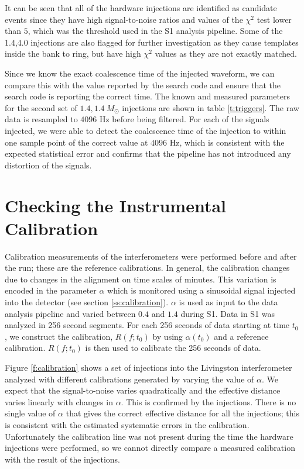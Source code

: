 It can be seen that all of the hardware injections are identified as candidate
events since they have high signal-to-noise ratios and values of the $\chi^2$
test lower than $5$, which was the threshold used in the S1 analysis
pipeline\cite{LIGOS1iul}. Some of the 1.4,4.0 injections are also flagged
for further investigation as they cause templates inside the bank to ring, but
have high $\chi^2$ values as they are not exactly matched.

Since we know the exact coalescence time of the injected waveform, we can
compare this with the value reported by the search code and ensure that the
search code is reporting the correct time.  The known and measured parameters
for the second set of $1.4,1.4\ M_\odot$ injections are shown in table
\ref{t:triggers}. The raw data is resampled to $4096$ Hz before being
filtered. For each of the signals injected, we were able to detect the
coalescence time of the injection to within one sample point of the correct
value at $4096$ Hz, which is consistent with the expected statistical error
and confirms that the pipeline has not introduced any distortion of the
signals.


\section{Checking the Instrumental Calibration}
\label{s:calibration}

Calibration measurements of the interferometers were performed before and
after the run; these are the reference calibrations. In general, the
calibration changes due to changes in the alignment on time scales of minutes.
This variation is encoded in the parameter $\alpha$ which is
monitored using a sinusoidal signal injected into the
detector (see section \ref{ss:calibration}). $\alpha$ is used as input
to the data analysis pipeline and varied between $0.4$ and $1.4$ during S1.
Data in S1 was analyzed in 256 second segments.  For each 256 seconds of data
starting at time $t_0$, we construct the calibration, $R(f;t_0)$ by using
$\alpha(t_0)$ and a reference calibration.  $R(f;t_0)$ is then used to
calibrate the 256 seconds of data.

Figure \ref{f:calibration} shows a set of injections into the Livingston
interferometer analyzed with different calibrations generated by varying the
value of $\alpha$. We expect that the signal-to-noise varies quadratically and
the effective distance varies linearly with changes in $\alpha$\cite{Allen:1996}.
This is confirmed by the injections.  There is no single value of $\alpha$
that gives the correct effective distance for all the injections; this is
consistent with the estimated systematic errors in the calibration.
Unfortunately the calibration line was not present during the time the
hardware injections were performed, so we cannot directly compare a measured
calibration with the result of the injections.

